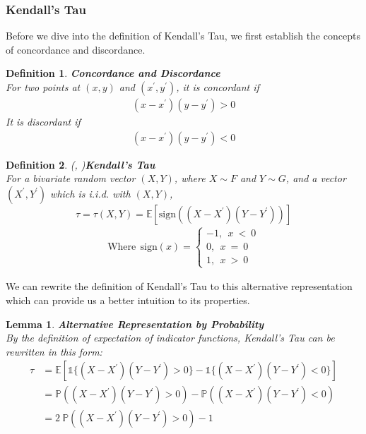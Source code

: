 \documentclass[12pt]{report}
\newtheorem{lemma}{Lemma}[subsection]
\newtheorem{definition}{Definition}[subsection]
\newcommand{\1}{\mathbf{1}}
\begin{document}
\subsubsection{Kendall's Tau}
\vspace{0.5cm}
Before we dive into the definition of Kendall's Tau, we first establish the concepts of concordance and discordance.

\begin{definition}\label{concorddiscorddef}\textbf{Concordance and Discordance} \\
For two points at $(x,y)$ and $(x^{'},y^{'})$, it is concordant if 
\begin{align*}
(x - x^{'})(y - y^{'}) > 0
\end{align*}
It is discordant if 
\begin{align*}
(x - x^{'})(y - y^{'}) < 0
\end{align*}
\end{definition}

\begin{definition}\label{KendallTauDefinition}
\textit{\normalfont(\cite{KendallTauAuthor1938}, \cite{HofertBook})}\:\textbf{Kendall's Tau} \\
For a bivariate random vector $(X,Y)$, where $X \sim F$ and $Y \sim G$, and a vector $(X^{'},Y^{'})$ which is i.i.d. with $(X,Y)$,
\begin{equation*}
\tau = \tau(X,Y) = \mathbb{E}[\mathrm{sign} ( (X - X^{'})(Y - Y^{'}) )]
\end{equation*}
\begin{align*}
\mathrm{Where} \: \: \mathrm{sign}(x) = 
\left\{ 
\begin{array}{rll}
-1, \: \:  x \: < \: 0 \\
0, \: \: x \: = \: 0 \\
1, \: \: x \: > \: 0
\end{array}
\right.
\end{align*}
\end{definition}

We can rewrite the definition of Kendall's Tau to this alternative representation which can provide us a better intuition to its properties.

\begin{lemma}
\label{KendallTauGeneralizationProb}
\textit{\normalfont\parencite{HofertBook}}\:\textbf{Alternative Representation by Probability}\\
By the definition of expectation of indicator functions, Kendall's Tau can be rewritten in this form:
\begin{align*}
\tau &= \mathbb{E}[\mathds{1}\{(X - X^{'})(Y - Y^{'})  >  0 \} - \mathds{1} \{ (X - X^{'})(Y - Y^{'})  <  0 \}] \\
&= \mathbb{P} \left( (X - X^{'})(Y - Y^{'}) > 0  \right) - \mathbb{P} \left( (X - X^{'})(Y - Y^{'}) < 0  \right)\\
&= 2 \: \mathbb{P} \left( (X - X^{'})(Y - Y^{'}) > 0  \right) - 1
\end{align*}
\end{lemma}
\end{document}
